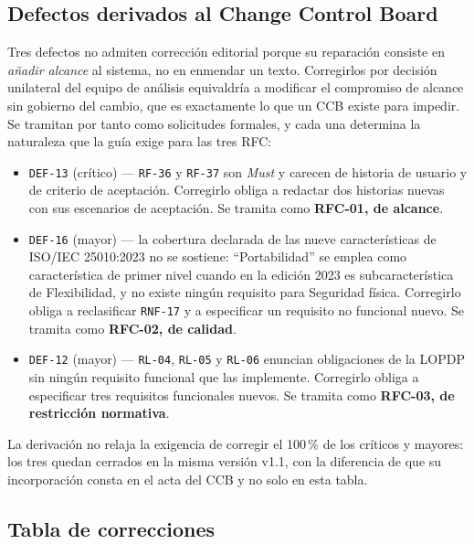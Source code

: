 \documentclass[11pt,letterpaper]{article}
\newcommand{\id}[1]{\texttt{#1}}
\begin{document}
\subsection*{Defectos derivados al Change Control Board}

Tres defectos no admiten corrección editorial porque su reparación consiste en \emph{añadir alcance}
al sistema, no en enmendar un texto. Corregirlos por decisión unilateral del equipo de análisis
equivaldría a modificar el compromiso de alcance sin gobierno del cambio, que es exactamente lo que
un CCB existe para impedir. Se tramitan por tanto como solicitudes formales, y cada una determina la
naturaleza que la guía exige para las tres RFC:

\begin{itemize}[leftmargin=*, nosep]
  \item \texttt{DEF-13} (crítico) --- \id{RF-36} y \id{RF-37} son \emph{Must} y carecen de historia
        de usuario y de criterio de aceptación. Corregirlo obliga a redactar dos historias nuevas con
        sus escenarios de aceptación. Se tramita como \textbf{RFC-01, de alcance}.
  \item \texttt{DEF-16} (mayor) --- la cobertura declarada de las nueve características de
        ISO/IEC 25010:2023 no se sostiene: ``Portabilidad'' se emplea como característica de primer
        nivel cuando en la edición 2023 es subcaracterística de Flexibilidad, y no existe ningún
        requisito para Seguridad física. Corregirlo obliga a reclasificar \id{RNF-17} y a especificar
        un requisito no funcional nuevo. Se tramita como \textbf{RFC-02, de calidad}.
  \item \texttt{DEF-12} (mayor) --- \id{RL-04}, \id{RL-05} y \id{RL-06} enuncian obligaciones de la
        LOPDP sin ningún requisito funcional que las implemente. Corregirlo obliga a especificar tres
        requisitos funcionales nuevos. Se tramita como \textbf{RFC-03, de restricción normativa}.
\end{itemize}

\noindent
La derivación no relaja la exigencia de corregir el 100\,\% de los críticos y mayores: los tres
quedan cerrados en la misma versión v1.1, con la diferencia de que su incorporación consta en el acta
del CCB y no solo en esta tabla.

\subsection*{Tabla de correcciones}
\end{document}
